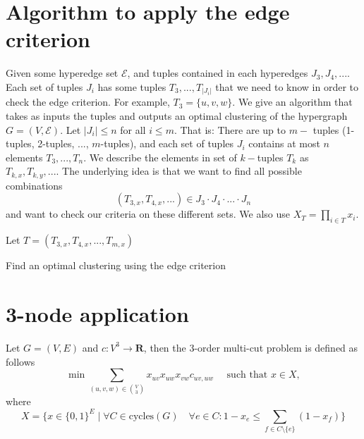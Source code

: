 \section{Algorithm to apply the edge criterion}
Given some hyperedge set $\mathcal{E}$, and tuples contained in each hyperedges $J_3,J_4,...$. Each set of tuples $J_i$ has some tuples $T_3, ..., T_{|J_i|}$ that we need to know in order to check the edge criterion. For example, $T_3=\{u,v,w\}$. We give an algorithm that takes as inputs the tuples and outputs an optimal clustering of the hypergraph $G=(V, \mathcal{E})$. 
Let $|J_i| \leq n$ for all $i \leq m$. That is: There are up to $m-$ tuples (1-tuples, 2-tuples, ..., $m$-tuples), and each set of tuples $J_i$ contains at most $n$ elements $T_3, ..., T_n$. 
We describe the elements in set of $k-$tuples $T_k$ as $T_{k,x}, T_{k,y}, ...$. 
The underlying idea is that we want to find all possible combinations \[ (T_{3,x}, T_{4,x}, ...) \in J_3 \cdot J_4 \cdot ... \cdot J_n \] and want to check our criteria on these different sets. We also use $X_T=\prod_{i \in T} x_i$.

\begin{algorithm}[h]
\SetAlgoLined
{}
Let $T=(T_{3,x}, T_{4,x}, ..., T_{m,x})$ \\
\caption{Find an optimal clustering using the edge criterion}
\end{algorithm}




\section{3-node application}
Let $G=(V,E)$ and $c: V^3 \to \mathbf{R}$, then the 3-order multi-cut problem is defined as follows 
\begin{equation}
    \min \sum_{(u,v,w) \in \binom{V}{3}} x_{uv}x_{uw}x_{vw}c_{uv,uw} \quad \text{ such that } x \in X, 
\end{equation}
where 
\begin{equation}
    X=\Bigg\{ x \in \{0,1\}^E \mid
   \forall C \in \text{cycles}(G) \quad \forall e \in C: 1-x_e \leq \sum_{f \in C \setminus \{e \}} (1-x_f) \Bigg\}
\end{equation}

